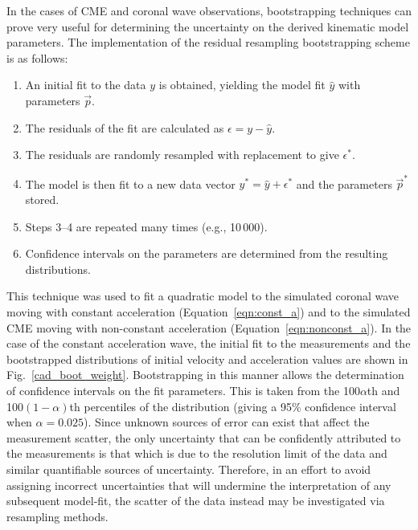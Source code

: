 \documentclass[structabstract]{aa}
\begin{document}
In the cases of CME and coronal wave observations, bootstrapping techniques can prove very useful for determining the uncertainty on the derived kinematic model parameters. The implementation of the residual resampling bootstrapping scheme is as follows:
\begin{enumerate}
\item An initial fit to the data $y$ is obtained, yielding the model fit $\hat{y}$ with parameters $\vec{p}$.
\item The residuals of the fit are calculated as $\epsilon = y - \hat{y}$.
\item The residuals are randomly resampled with replacement to give $\epsilon^*$.
\item The model is then fit to a new data vector $y^* = \hat{y} + \epsilon^*$ and the parameters $\vec{p}^*$ stored.
\item Steps 3--4 are repeated many times (e.g., 10\,000).
\item Confidence intervals on the parameters are determined from the resulting distributions.
\end{enumerate}
This technique was used to fit a quadratic model to the simulated coronal wave moving with constant acceleration (Equation~\ref{eqn:const_a}) and to the simulated CME moving with non-constant acceleration (Equation~\ref{eqn:nonconst_a}). In the case of the constant acceleration wave, the initial fit to the measurements and the bootstrapped distributions of initial velocity and acceleration values are shown in Fig.~\ref{cad_boot_weight}. Bootstrapping in this manner allows the determination of confidence intervals on the fit parameters. This is taken from the 100$\alpha$th and 100$\left(1-\alpha\right)$th percentiles of the distribution (giving a 95\% confidence interval when $\alpha=0.025$). Since unknown sources of error can exist that affect the measurement scatter, the only uncertainty that can be confidently attributed to the measurements is that which is due to the resolution limit of the data and similar quantifiable sources of uncertainty. Therefore, in an effort to avoid assigning incorrect uncertainties that will undermine the interpretation of any subsequent model-fit, the scatter of the data instead may be investigated via resampling methods.
\end{document}
